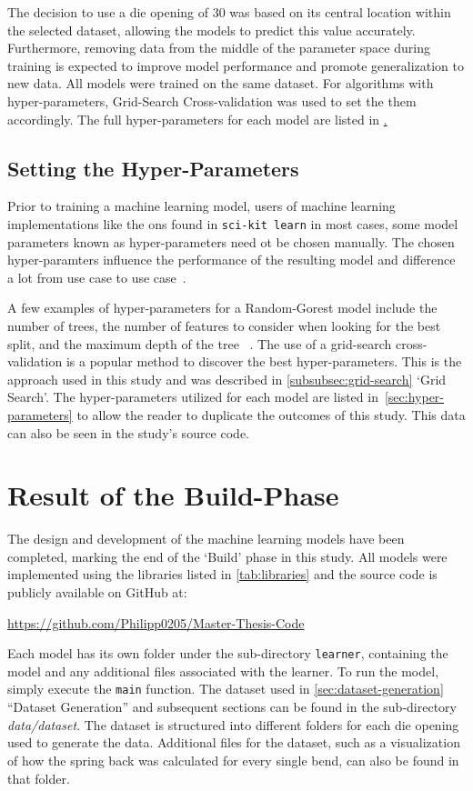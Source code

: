 The decision to use a die opening of 30 was based on its central location within the selected dataset, allowing the
models to predict this value accurately.
Furthermore, removing data from the middle of the parameter space during
training is expected to improve model performance and promote generalization to new data.
All models were trained on the same dataset.
For algorithms with hyper-parameters, Grid-Search Cross-validation was used to set the them accordingly.
The full hyper-parameters for each model are listed in \href{sec:hyper-parameters}.

\subsection{Setting the Hyper-Parameters}\label{subsec:hyper-parameters}
Prior to training a machine learning model, users of machine learning implementations like the ons found in
\texttt{sci-kit learn}
in most cases, some model parameters known as hyper-parameters need ot be chosen manually.
The chosen hyper-paramters influence the performance of the resulting model and difference a lot from use
case to use case~\cite[pp. 1]{probst2019tunability}.

A few examples of hyper-parameters for a Random-Gorest model \cite{scikit-learn} include the number of trees, the number
of features to consider when looking for the best split, and the maximum depth of the tree
~\cite{scikit-learn}.
The use of a grid-search cross-validation is a popular method to discover the best hyper-parameters.
This is the approach used in this study and was described in \cref{subsubsec:grid-search} `Grid Search'.
The hyper-parameters utilized for each model are listed in~\cref{sec:hyper-parameters} to allow the reader to
duplicate the outcomes of this study.
This data can also be seen in the study's source code.


\section{Result of the Build-Phase}\label{sec:results-build-phase}

The design and development of the machine learning models have been completed, marking the end of the `Build' phase
in this study.
All models were implemented using the libraries listed in \cref{tab:libraries} and the source
code is publicly available on GitHub at:

\url{https://github.com/Philipp0205/Master-Thesis-Code}

Each model has its own folder under the sub-directory \texttt{learner}, containing the model and any additional files
associated with the learner.
To run the model, simply execute the \texttt{main} function.
The dataset used in \cref{sec:dataset-generation} ``Dataset Generation'' and subsequent sections can be found in
the sub-directory \textit{data/dataset}.
The dataset is structured into different folders for each die opening used
to generate the data.
Additional files for the dataset, such as a visualization of how the spring back was calculated
for every single bend, can also be found in that folder.